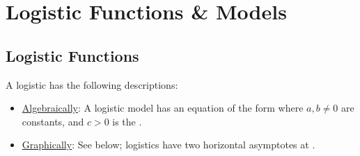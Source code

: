 \documentclass[notes]{subfiles}
\begin{document}
	\fancyhead[LO,RE]{\bfseries \currentname}
	\fancyfoot[C]{{}}
	\fancyfoot[RO,LE]{\large \thepage}	%


\section*{Logistic Functions \& Models}\label{cs110}
	\subsection*{Logistic Functions}
		A logistic has the following descriptions:\\
		\begin{itemize}
			\item \underline{Algebraically}: A logistic model has an equation of the form  where  $a,b\neq 0$ are constants, and $c > 0$ is the .  \\
			\item \underline{Graphically}: See below; logistics have two horizontal asymptotes at .  
		\end{itemize}
\end{document}
